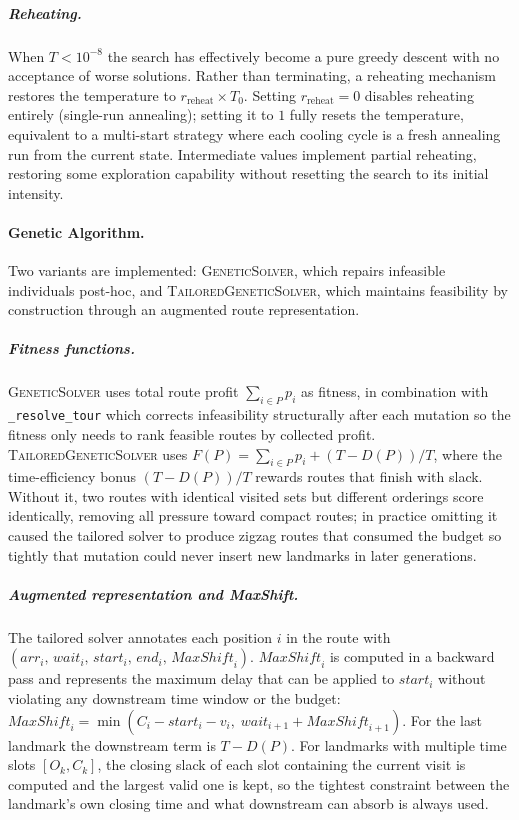\subparagraph{Reheating.}
When $T < 10^{-8}$ the search has effectively become a pure greedy descent with no acceptance of worse solutions. Rather than terminating, a reheating mechanism restores the temperature to $r_{\mathrm{reheat}} \times T_0$. Setting $r_{\mathrm{reheat}} = 0$ disables reheating entirely (single-run annealing); setting it to $1$ fully resets the temperature, equivalent to a multi-start strategy where each cooling cycle is a fresh annealing run from the current state. Intermediate values implement partial reheating, restoring some exploration capability without resetting the search to its initial intensity.

\paragraph{Genetic Algorithm.}

Two variants are implemented: \textsc{GeneticSolver}, which repairs infeasible individuals post-hoc, and \textsc{TailoredGeneticSolver}, which maintains feasibility by construction through an augmented route representation.

\subparagraph{Fitness functions.}
\textsc{GeneticSolver} uses total route profit $\sum_{i\in P}p_i$ as fitness, in combination with \texttt{\_resolve\_tour} which corrects infeasibility structurally after each mutation so the fitness only needs to rank feasible routes by collected profit. \textsc{TailoredGeneticSolver} uses $F(P) = \sum_{i\in P}p_i + (T - D(P))/T$, where the time-efficiency bonus $(T - D(P))/T$ rewards routes that finish with slack. Without it, two routes with identical visited sets but different orderings score identically, removing all pressure toward compact routes; in practice omitting it caused the tailored solver to produce zigzag routes that consumed the budget so tightly that mutation could never insert new landmarks in later generations.

\subparagraph{Augmented representation and MaxShift.}
The tailored solver annotates each position $i$ in the route with $(\mathit{arr}_i,\,\mathit{wait}_i,\,\mathit{start}_i,\,\mathit{end}_i,\,\mathit{MaxShift}_i)$. $\mathit{MaxShift}_i$ is computed in a backward pass and represents the maximum delay that can be applied to $\mathit{start}_i$ without violating any downstream time window or the budget: $\mathit{MaxShift}_i = \min(C_i - \mathit{start}_i - v_i,\;\mathit{wait}_{i+1} + \mathit{MaxShift}_{i+1})$. For the last landmark the downstream term is $T - D(P)$. For landmarks with multiple time slots $[O_k, C_k]$, the closing slack of each slot containing the current visit is computed and the largest valid one is kept, so the tightest constraint between the landmark's own closing time and what downstream can absorb is always used.

